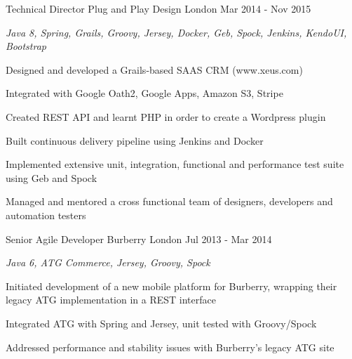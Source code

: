\begin{cventries}
  \cventry
    {Technical Director} %
    {Plug and Play Design} %
    {London} %
    {Mar 2014 - Nov 2015} %
    {
      \begin{cvitems} %
        \item {\itshape{Java 8, Spring, Grails, Groovy, Jersey, Docker, Geb, Spock, Jenkins, KendoUI, Bootstrap}}
        \item {Designed and developed a Grails-based SAAS CRM (www.xeus.com)}
        \item {Integrated with Google Oath2, Google Apps, Amazon S3, Stripe}
        \item {Created REST API and learnt PHP in order to create a Wordpress plugin}
        \item {Built continuous delivery pipeline using Jenkins and Docker}
        \item {Implemented extensive unit, integration, functional and performance test suite using Geb and Spock}
        \item {Managed and mentored a cross functional team of designers, developers and automation testers}
      \end{cvitems}
    }

  \cventry
    {Senior Agile Developer} %
    {Burberry} %
    {London} %
    {Jul 2013 - Mar 2014} %
    {
      \begin{cvitems} %
        \item {\itshape{Java 6, ATG Commerce, Jersey, Groovy, Spock}}
        \item {Initiated development of a new mobile platform for Burberry, wrapping their legacy ATG implementation in a REST interface}
        \item {Integrated ATG with Spring and Jersey, unit tested with Groovy/Spock}
        \item {Addressed performance and stability issues with Burberry’s legacy ATG site}
      \end{cvitems}
    }


\end{cventries}
